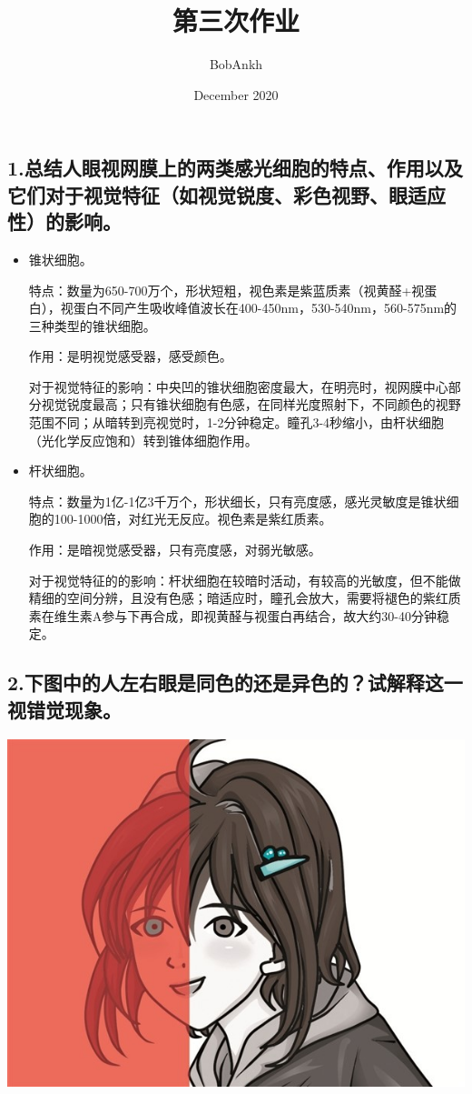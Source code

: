 \documentclass[]{article}
\title{第三次作业}
\author{BobAnkh}
\date{December 2020}
\begin{document}
\maketitle

\hypertarget{header-n80}{%
\subsection{1.总结人眼视网膜上的两类感光细胞的特点、作用以及它们对于视觉特征（如视觉锐度、彩色视野、眼适应性）的影响。}\label{header-n80}}
\begin{itemize}
\item
    锥状细胞。
    
    特点：数量为650-700万个，形状短粗，视色素是紫蓝质素（视黄醛+视蛋白），视蛋白不同产生吸收峰值波长在400-450nm，530-540nm，560-575nm的三种类型的锥状细胞。
    
    作用：是明视觉感受器，感受颜色。
    
    对于视觉特征的影响：中央凹的锥状细胞密度最大，在明亮时，视网膜中心部分视觉锐度最高；只有锥状细胞有色感，在同样光度照射下，不同颜色的视野范围不同；从暗转到亮视觉时，1-2分钟稳定。瞳孔3-4秒缩小，由杆状细胞（光化学反应饱和）转到锥体细胞作用。
    
\item
    杆状细胞。
    
    特点：数量为1亿-1亿3千万个，形状细长，只有亮度感，感光灵敏度是锥状细胞的100-1000倍，对红光无反应。视色素是紫红质素。
    
    作用：是暗视觉感受器，只有亮度感，对弱光敏感。
    
    对于视觉特征的的影响：杆状细胞在较暗时活动，有较高的光敏度，但不能做精细的空间分辨，且没有色感；暗适应时，瞳孔会放大，需要将褪色的紫红质素在维生素A参与下再合成，即视黄醛与视蛋白再结合，故大约30-40分钟稳定。

\end{itemize}
\hypertarget{header-n87}{%
\subsection{2.下图中的人左右眼是同色的还是异色的？试解释这一视错觉现象。}\label{header-n87}}

\centerline{\includegraphics[scale=.5]{figures/q2.jpg}}
\end{document}
